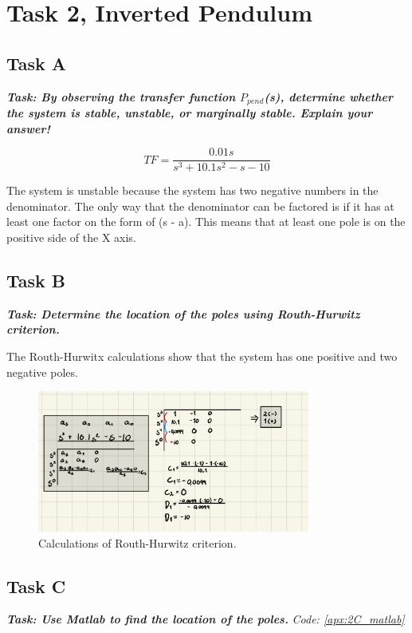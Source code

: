 \section{Task 2, Inverted Pendulum}
\subsection{Task A}
\textbf{\textit{Task: By observing the transfer function $P_{pend}$(s), determine whether the system is stable, unstable,
or marginally stable. Explain your answer!}}

\begin{equation*}
    TF = \frac{0.01s}{s^3 + 10.1s^2-s-10}
\end{equation*}

The system is unstable because the system has two negative numbers in the denominator. The only way that the denominator can be factored is if it has at least one factor on the form of (s - a). This means that at least one pole is on the positive side of the X axis.

\subsection{Task B}
\textbf{\textit{Task: Determine the location of the poles using Routh-Hurwitz criterion.}}

The Routh-Hurwitx calculations show that the system has one positive and two negative poles.

\begin{figure}[h]
    \centering
    \includegraphics[width = 0.8\textwidth]{Images/2B_Calc.jpeg}
    \caption{Calculations of Routh-Hurwitz criterion.}
    \label{fig:2B_Calc}
\end{figure}


\subsection{Task C}
\textbf{\textit{Task: Use Matlab to find the location of the poles.}}
\newline
\textit{Code: \ref{apx:2C_matlab}}


